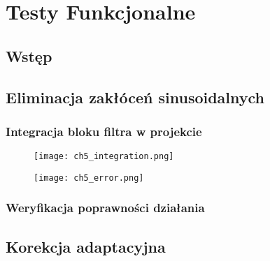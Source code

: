 \chapter{Testy Funkcjonalne}
\section{Wstęp}
\section{Eliminacja zakłóceń sinusoidalnych}
\subsection{Integracja bloku filtra w projekcie}
\begin{figure}[ht]
\centering
\texttt{[image: ch5\_integration.png]}
\end{figure}
\begin{figure}[ht]
\centering
\texttt{[image: ch5\_error.png]}
\end{figure}
\subsection{Weryfikacja poprawności działania}
\section{Korekcja adaptacyjna}




